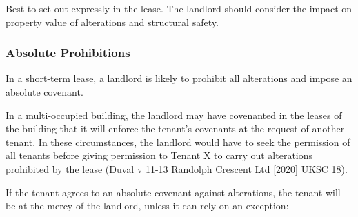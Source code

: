 \documentclass[
]{article}
\begin{document}
Best to set out expressly in the lease. The landlord should consider the
impact on property value of alterations and structural safety.

\hypertarget{absolute-prohibitions}{%
\subsubsection{Absolute Prohibitions}\label{absolute-prohibitions}}

In a short-term lease, a landlord is likely to prohibit all alterations
and impose an absolute covenant.

In a multi-occupied building, the landlord may have covenanted in the
leases of the building that it will enforce the tenant's covenants at
the request of another tenant. In these circumstances, the landlord
would have to seek the permission of all tenants before giving
permission to Tenant X to carry out alterations prohibited by the lease
(Duval v 11-13 Randolph Crescent Ltd {[}2020{]} UKSC 18).

If the tenant agrees to an absolute covenant against alterations, the
tenant will be at the mercy of the landlord, unless it can rely on an
exception:
\end{document}
